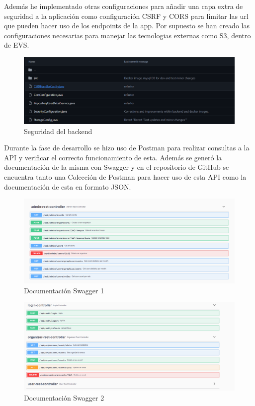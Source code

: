 Además he implementado otras configuraciones para añadir una capa extra de seguridad a la aplicación como configuración CSRF y CORS para limitar las url 
que pueden hacer uso de los endpoints de la app. Por supuesto se han creado las configuraciones necesarias para manejar las tecnologias externas como S3, dentro de 
EVS.
\newpage
\begin{figure}[h]
    \centering
    \includegraphics[width=1\textwidth]{security.png} 
    \caption{Seguridad del backend}
    \label{fig:securityClasses}
\end{figure}

Durante la fase de desarrollo se hizo uso de Postman para realizar consultas a la API y verificar el correcto funcionamiento de esta. Además se generó la documentación de la
misma con Swagger y en el repositorio de GitHub se encuentra tanto una Colección de Postman para hacer uso de esta API como la documentación de esta en formato JSON.

\begin{figure}[h]
    \centering
    \includegraphics[width=1\textwidth]{Swagger1.png} 
    \caption{Documentación Swagger 1}
    \label{fig:swagger}
\end{figure}
\newpage
\begin{figure}[h]
    \centering
    \includegraphics[width=1\textwidth]{Swagger2.png} 
    \caption{Documentación Swagger 2}
    \label{fig:swagger2}
\end{figure}

